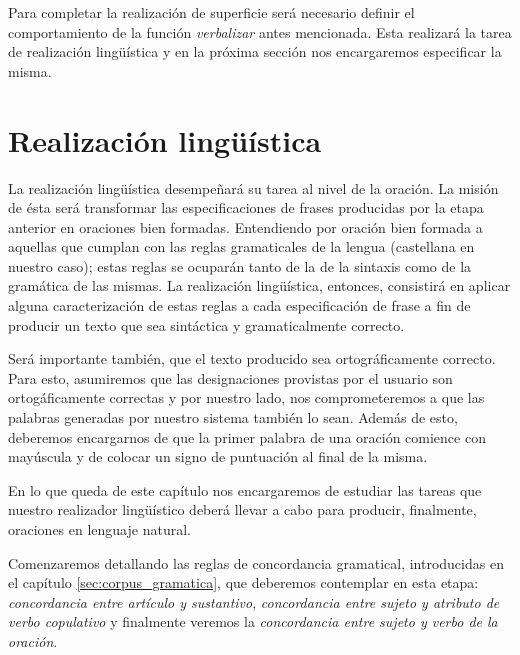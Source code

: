 Para completar la realización de superficie será necesario definir el comportamiento de la función \emph{verbalizar} antes mencionada. Esta realizará la tarea de realización lingüística y en la próxima sección nos encargaremos especificar la misma.





\section{Realización lingüística}
\label{cap:linguistic_realization}

La realización lingüística desempeñará su tarea al nivel de la oración. La misión de ésta será transformar las especificaciones de frases producidas por la etapa anterior en oraciones bien formadas. Entendiendo por oración bien formada a aquellas que cumplan con las reglas gramaticales de la lengua (castellana en nuestro caso); estas reglas se ocuparán tanto de la de la sintaxis como de la gramática de las mismas. La realización lingüística, entonces, consistirá en aplicar alguna caracterización de estas reglas a cada especificación de frase a fin de producir un texto que sea sintáctica y gramaticalmente correcto.

Será importante también, que el texto producido sea ortográficamente correcto. Para esto, asumiremos que las designaciones provistas por el usuario son ortogáficamente correctas y por nuestro lado, nos comprometeremos a que las palabras generadas por nuestro sistema también lo sean. Además de esto, deberemos encargarnos de que la primer palabra de una oración comience con mayúscula y de colocar un signo de puntuación al final de la misma.

En lo que queda de este capítulo nos encargaremos de estudiar las tareas que nuestro realizador lingüístico deberá llevar a cabo para producir, finalmente, oraciones en lenguaje natural. 

Comenzaremos detallando las reglas de concordancia gramatical, introducidas en el capítulo \ref{sec:corpus_gramatica}, que deberemos contemplar en esta etapa: \emph{concordancia entre artículo y sustantivo}, \emph{concordancia entre sujeto y atributo de verbo copulativo} y finalmente veremos la \emph{concordancia entre sujeto y verbo de la oración}.

